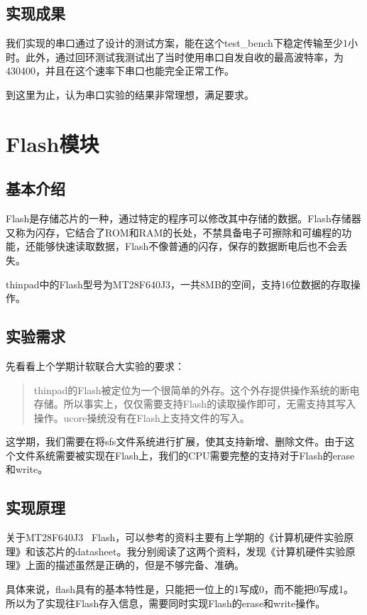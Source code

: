 \subsection{实现成果}
我们实现的串口通过了设计的测试方案，能在这个test\_bench下稳定传输至少1小时。此外，通过回环测试我测试出了当时使用串口自发自收的最高波特率，为430400，并且在这个速率下串口也能完全正常工作。

到这里为止，认为串口实验的结果非常理想，满足要求。




\section{Flash模块}
\subsection{基本介绍}
Flash是存储芯片的一种，通过特定的程序可以修改其中存储的数据。Flash存储器又称为闪存，它结合了ROM和RAM的长处，不禁具备电子可擦除和可编程的功能，还能够快速读取数据，Flash不像普通的闪存，保存的数据断电后也不会丢失。

thinpad中的Flash型号为MT28F640J3，一共8MB的空间，支持16位数据的存取操作。

\subsection{实验需求}
先看看上个学期计软联合大实验的要求：

\begin{quote}
thinpad的Flash被定位为一个很简单的外存。这个外存提供操作系统的断电存储。所以事实上，仅仅需要支持Flash的读取操作即可，无需支持其写入操作。ucore操统没有在Flash上支持文件的写入。
\end{quote}

这学期，我们需要在将sfs文件系统进行扩展，使其支持新增、删除文件。由于这个文件系统需要被实现在Flash上，我们的CPU需要完整的支持对于Flash的erase和write。

\subsection{实现原理}
关于MT28F640J3 \ Flash，可以参考的资料主要有上学期的《计算机硬件实验原理》和该芯片的datasheet。我分别阅读了这两个资料，发现《计算机硬件实验原理》上面的描述虽然是正确的，但是不够完备、准确。

具体来说，flash具有的基本特性是，只能把一位上的1写成0，而不能把0写成1。所以为了实现往Flash存入信息，需要同时实现Flash的erase和write操作。

